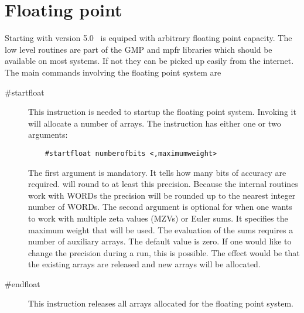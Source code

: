
\chapter{Floating point}
\label{floatingpoint}

Starting with version 5.0 \FORM\ is equiped with arbitrary floating point 
capacity. The low level routines are part of the GMP and mpfr libraries 
which should be available on most systems. If not they can be picked up 
easily from the internet. The main commands involving the floating point 
system are
\begin{description}
\item[\#startfloat] This instruction is needed to startup the floating 
point system. Invoking it will allocate a number of arrays. The instruction 
has either one or two arguments:
\begin{verbatim}
    #startfloat numberofbits <,maximumweight>
\end{verbatim}
The first argument is mandatory. It tells how many bits of accuracy are 
required. \FORM will round to at least this precision. Because the internal 
routines work with WORDs the precision will be rounded up to the nearest 
integer number of WORDs. The second argument is optional for when one wants 
to work with multiple zeta values (MZVs) or Euler sums. It specifies the 
maximum weight that will be used. The evaluation of the sums requires a 
number of auxiliary arrays. The default value is zero. If one would like to 
change the precision during a run, this is possible. The effect would be 
that the existing arrays are released and new arrays will be allocated.
\item[\#endfloat] This instruction releases all arrays allocated for the 
floating point system.
\end{description}
